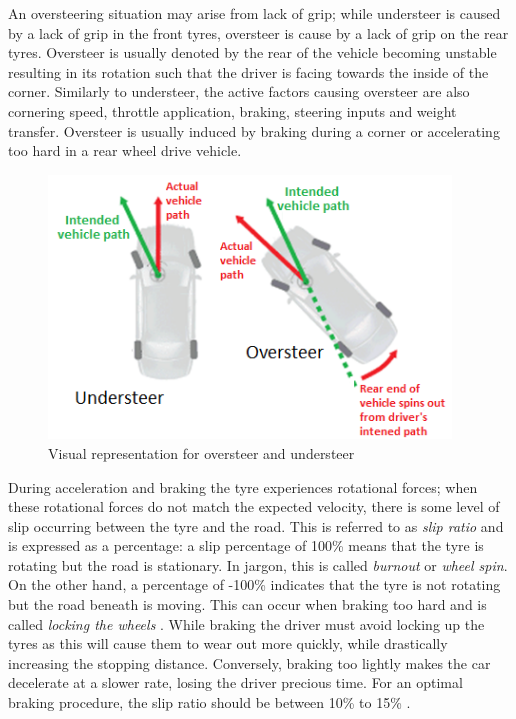 An oversteering situation may arise from lack of grip; while understeer is caused by a lack of grip in the front tyres, oversteer is cause by a lack of grip on the rear tyres. Oversteer is usually denoted by the rear of the vehicle becoming unstable resulting in its rotation such that the driver is facing towards the inside of the corner. Similarly to understeer, the active factors causing oversteer are also cornering speed, throttle application, braking, steering inputs and weight transfer. Oversteer is usually induced by braking during a corner or accelerating too hard in a rear wheel drive vehicle.
%

\begin{figure}[!htb]
	\centering
	\includegraphics[height=7cm]{images/overundersteer}
	\caption{Visual representation for oversteer and understeer}
	\label{fig:overundersteer}
\end{figure}

During acceleration and braking the tyre experiences rotational forces; when these rotational forces do not match the expected velocity, there is some level of slip occurring between the tyre and the road. This is referred to as \emph{slip ratio} and is expressed as a percentage: a slip percentage of 100\% means that the tyre is rotating but the road is stationary. In jargon, this is called \emph{burnout} or \emph{wheel spin}. On the other hand, a percentage of -100\% indicates that the tyre is not rotating but the road beneath is moving. This can occur when braking too hard and is called \emph{locking the wheels} \cite{pacejka2006tire}. While braking the driver must avoid locking up the tyres as this will cause them to wear out more quickly, while drastically increasing the stopping distance. Conversely, braking too lightly makes the car decelerate at a slower rate, losing the driver precious time. For an optimal braking procedure, the slip ratio should be between 10\% to 15\% \cite{GoingFaster}.

